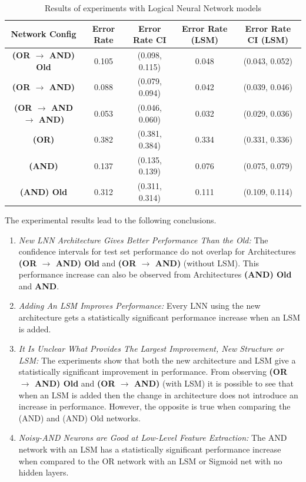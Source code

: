\begin{table}[H]
	\begin{center}
		\begin{tabular}{| c | c | c | c | c |}
			\hline
			\textbf{Network Config} & \textbf{Error Rate} & \textbf{Error Rate CI} & \textbf{Error Rate (LSM)} & \textbf{Error Rate CI (LSM)}\\
			\hline
			\hline
			\textbf{(OR $\rightarrow$ AND) Old } & 0.105 & (0.098, 0.115) & 0.048 & (0.043, 0.052)\\
			\textbf{(OR $\rightarrow$ AND) } & 0.088 & (0.079, 0.094) & 0.042 & (0.039, 0.046)\\
			\textbf{(OR $\rightarrow$ AND $\rightarrow$ AND) } & 0.053 & (0.046, 0.060) & 0.032 & (0.029, 0.036)\\
			\textbf{(OR) } & 0.382 & (0.381, 0.384) & 0.334 & (0.331, 0.336)\\
			\textbf{(AND) } & 0.137 & (0.135, 0.139) & 0.076 & (0.075, 0.079)\\
			\textbf{(AND) Old} & 0.312 & (0.311, 0.314) & 0.111 & (0.109, 0.114)\\
			\hline
		\end{tabular}
	\end{center}
	\caption{Results of experiments with Logical Neural Network models}
	\label{tab:mnist-lnn-peformance-results}
\end{table}

The experimental results lead to the following conclusions.
\begin{enumerate}
	\item \textit{New LNN Architecture Gives Better Performance Than the Old:} The confidence intervals for test set performance do not overlap for Architectures \textbf{(OR $\rightarrow$ AND) Old} and \textbf{(OR $\rightarrow$ AND)} (without LSM). This performance increase can also be observed from Architectures \textbf{(AND) Old} and \textbf{AND}.
	
	\item \textit{Adding An LSM Improves Performance:} Every LNN using the new architecture gets a statistically significant performance increase when an LSM is added.

	\item \textit{It Is Unclear What Provides The Largest Improvement, New Structure or LSM:} The experiments show that both the new architecture and LSM give a statistically significant improvement in performance. From observing \textbf{(OR $\rightarrow$ AND) Old} and \textbf{(OR $\rightarrow$ AND)} (with LSM) it is possible to see that when an LSM is added then the change in architecture does not introduce an increase in performance. However, the opposite is true when comparing the (AND) and (AND) Old networks.
	
	\item \textit{Noisy-AND Neurons are Good at Low-Level Feature Extraction:} The AND network with an LSM has a statistically significant performance increase when compared to the OR network with an LSM or Sigmoid net with no hidden layers.
\end{enumerate}

